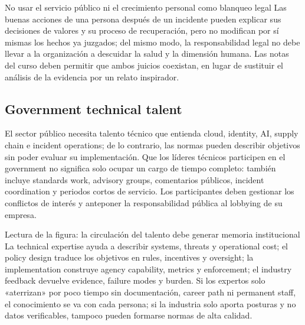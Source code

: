 \begin{warningbox}{No usar el servicio público ni el crecimiento personal como blanqueo legal}
Las buenas acciones de una persona después de un incidente pueden explicar sus decisiones de valores y su proceso de recuperación, pero no modifican por sí mismas los hechos ya juzgados; del mismo modo, la responsabilidad legal no debe llevar a la organización a descuidar la salud y la dimensión humana. Las notas del curso deben permitir que ambos juicios coexistan, en lugar de sustituir el análisis de la evidencia por un relato inspirador.
\end{warningbox}

\subsection{Government technical talent}

El sector público necesita talento técnico que entienda cloud, identity, AI, supply chain e incident operations; de lo contrario, las normas pueden describir objetivos sin poder evaluar su implementación. Que los líderes técnicos participen en el government no significa solo ocupar un cargo de tiempo completo: también incluye standards work, advisory groups, comentarios públicos, incident coordination y periodos cortos de servicio. Los participantes deben gestionar los conflictos de interés y anteponer la responsabilidad pública al lobbying de su empresa.


\begin{knowledgebox}{Lectura de la figura: la circulación del talento debe generar memoria institucional}
La technical expertise ayuda a describir systems, threats y operational cost; el policy design traduce los objetivos en rules, incentives y oversight; la implementation construye agency capability, metrics y enforcement; el industry feedback devuelve evidence, failure modes y burden. Si los expertos solo «aterrizan» por poco tiempo sin documentación, career path ni permanent staff, el conocimiento se va con cada persona; si la industria solo aporta posturas y no datos verificables, tampoco pueden formarse normas de alta calidad.
\end{knowledgebox}

